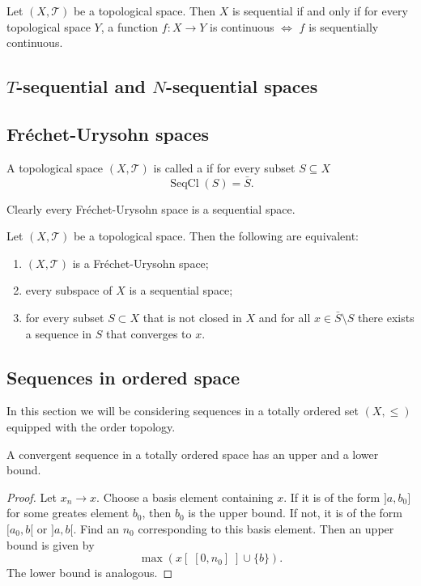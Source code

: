 \begin{proposition}
Let $(X,\mathcal{T})$ be a topological space. Then $X$ is sequential \textup{if and only if} for every topological space $Y$, a function $f:X\to Y$ is continuous $\Leftrightarrow$ $f$ is sequentially continuous.
\end{proposition}


\subsection{$T$-sequential and $N$-sequential spaces}

\subsection{Fréchet-Urysohn spaces}
\begin{definition}
A topological space $(X,\mathcal{T})$ is called a  if for every subset $S\subseteq X$
\[ \operatorname{SeqCl}(S) = \bar{S}. \]
\end{definition}
Clearly every Fréchet-Urysohn space is a sequential space.

\begin{proposition} \label{FrechetUrysohn}
Let $(X,\mathcal{T})$ be a topological space. Then the following are equivalent:
\begin{enumerate}
\item $(X,\mathcal{T})$ is a Fréchet-Urysohn space;
\item every subspace of $X$ is a sequential space;
\item for every subset $S\subset X$ that is not closed in $X$ and for all $x\in \bar{S}\setminus S$ there exists a sequence in $S$ that converges to $x$.
\end{enumerate}
\end{proposition}

\subsection{Sequences in ordered space}
In this section we will be considering sequences in a totally ordered set $(X,\leq)$ equipped with the order topology.

\begin{lemma} \label{convergentSequenceIsBounded}
A convergent sequence in a totally ordered space has an upper and a lower bound.
\end{lemma}
\begin{proof}
Let $x_n\to x$. Choose a basis element containing $x$. If it is of the form $]a,b_0]$ for some greates element $b_0$, then $b_0$ is the upper bound. If not, it is of the form $[a_0,b[$ or $]a,b[$. Find an $n_0$ corresponding to this basis element. Then an upper bound is given by
\[ \max(x[\;[0,n_0]\;]\cup\{b\}). \]
The lower bound is analogous.
\end{proof}

